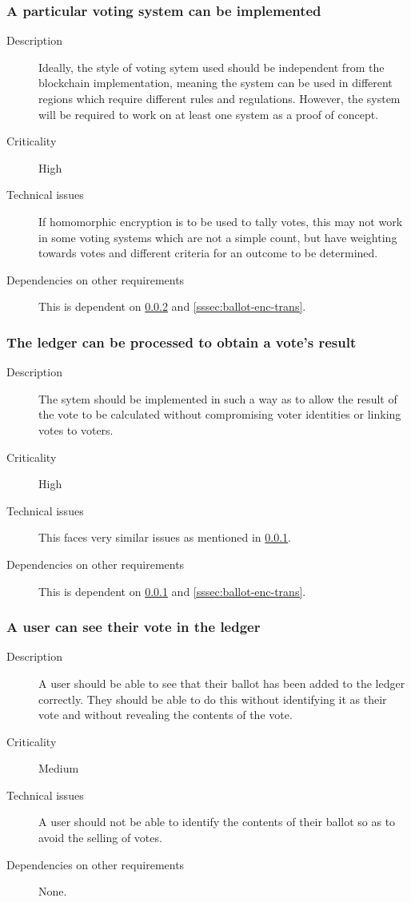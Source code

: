 \documentclass[a4paper,12pt]{article}
\begin{document}
\subsubsection{A particular voting system can be implemented}
\label{sssec:vote-sys-rep}
\begin{description}
	\item[Description]
		Ideally, the style of voting sytem used should be independent from the blockchain implementation, meaning the system can be used in different regions which require different rules and regulations. However, the system will be required to work on at least one system as a proof of concept.
	\item[Criticality]
		High
	\item[Technical issues]
		If homomorphic encryption is to be used to tally votes, this may not work in some voting systems which are not a simple count, but have weighting towards votes and different criteria for an outcome to be determined.
	\item[Dependencies on other requirements]
		This is dependent on \ref{sssec:vote-sys-calc} and \ref{sssec:ballot-enc-trans}.
\end{description}

\subsubsection{The ledger can be processed to obtain a vote's result}
\label{sssec:vote-sys-calc}
\begin{description}
	\item[Description]
		The sytem should be implemented in such a way as to allow the result of the vote to be calculated without compromising voter identities or linking votes to voters.
	\item[Criticality]
		High
	\item[Technical issues]
		This faces very similar issues as mentioned in \ref{sssec:vote-sys-rep}.
	\item[Dependencies on other requirements]
		This is dependent on \ref{sssec:vote-sys-rep} and \ref{sssec:ballot-enc-trans}.
\end{description}

\subsubsection{A user can see their vote in the ledger}
\label{sssec:vote-sys-view}
\begin{description}
	\item[Description]
		A user should be able to see that their ballot has been added to the ledger correctly. They should be able to do this without identifying it as their vote and without revealing the contents of the vote.
	\item[Criticality]
		Medium
	\item[Technical issues]
		A user should not be able to identify the contents of their ballot so as to avoid the selling of votes.
	\item[Dependencies on other requirements]
		None.
\end{description}
\end{document}
